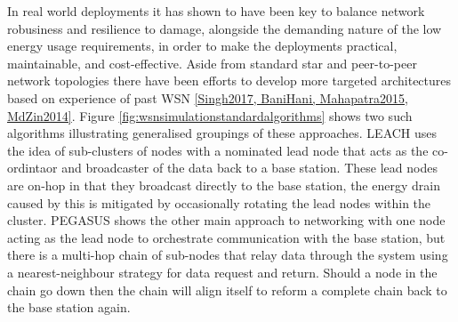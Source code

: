 In real world deployments it has shown to have been key to balance network robusiness and resilience to damage, alongside the demanding nature of the low energy usage requirements, in order to make the deployments practical, maintainable, and cost-effective. Aside from standard star and peer-to-peer network topologies \cite{Oliveira2011} there have been efforts to develop more targeted architectures based on experience of past WSN \ref{Singh2017, BaniHani, Mahapatra2015, MdZin2014}. Figure \ref{fig:wsnsimulationstandardalgorithms} shows two such algorithms illustrating generalised groupings of these approaches. LEACH uses the idea of sub-clusters of nodes with a nominated lead node that acts as the co-ordintaor and broadcaster of the data back to a base station. These lead nodes are on-hop in that they broadcast directly to the base station, the energy drain caused by this is mitigated by occasionally rotating the lead nodes within the cluster. PEGASUS shows the other main approach to networking with one node acting as the lead node to orchestrate communication with the base station, but there is a multi-hop chain of sub-nodes that relay data through the system using a nearest-neighbour strategy for data request and return. Should a node in the chain go down then the chain will align itself to reform a complete chain back to the base station again. 
\newline
\newline


